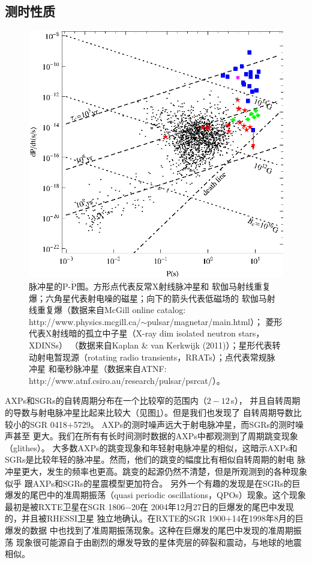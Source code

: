 \subsection{测时性质}

\begin{figure}
\centering
\includegraphics[width=12cm]{PPdot.eps}
\caption{脉冲星的P-$\mathrm{\dot{P}}$图\supercite{tx11}。方形点代表反常X射线脉冲星和
软伽马射线重复爆；六角星代表射电噪的磁星；向下的箭头代表低磁场的
软伽马射线重复爆（数据来自McGill online catalog:
http://www.physics.mcgill.ca/$\sim$pulsar/magnetar/main.html）；
菱形代表X射线暗的孤立中子星（X-ray dim isolated neutron stars，XDINSs）
（数据来自Kaplan \& van Kerkwijk (2011)\supercite{kv11}）；星形代表转
动射电暂现源（rotating radio transients，RRATs）；点代表常规脉冲星
和毫秒脉冲星（数据来自ATNF: http://www.atnf.csiro.au/research/pulsar/psrcat/）。}
\label{PPdot}
\end{figure}

AXPs和SGRs的自转周期分布在一个比较窄的范围内（$2-12$\,s），
并且自转周期的导数与射电脉冲星比起来比较大（见图\ref{PPdot}）。但是我们也发现了
自转周期导数比较小的SGR 0418$+$5729\supercite{ret10}。
%
AXPs的测时噪声远大于射电脉冲星，而SGRs的测时噪声甚至
更大。我们在所有有长时间测时数据的AXPs中都观测到了周期跳变现象（glithes）。
大多数AXPs的跳变现象和年轻射电脉冲星的相似，这暗示AXPs和
SGRs是比较年轻的脉冲星。然而，他们的跳变的幅度比有相似自转周期的射电
脉冲星更大，发生的频率也更高。跳变的起源仍然不清楚，但是所观测到的各种现象似乎
跟AXPs和SGRs的星震模型更加符合\supercite{m08}。
%
另外一个有趣的发现是在SGRs的巨爆发的尾巴中的准周期振荡（quasi 
periodic oscillations，QPOs）现象。这个现象最初是被RXTE卫星在SGR 1806$-$20在
2004年12月27日的巨爆发的尾巴中发现的\supercite{ibs05}，并且被RHESSI卫星
独立地确认\supercite{ws06}。在RXTE的SGR 1900$+$14在1998年8月的巨爆发的数据
中也找到了准周期振荡现象\supercite{sw05}。这种在巨爆发的尾巴中发现的准周期振荡
现象很可能源自于由剧烈的爆发导致的星体壳层的碎裂和震动，与地球的地震相似\supercite{m08}。

